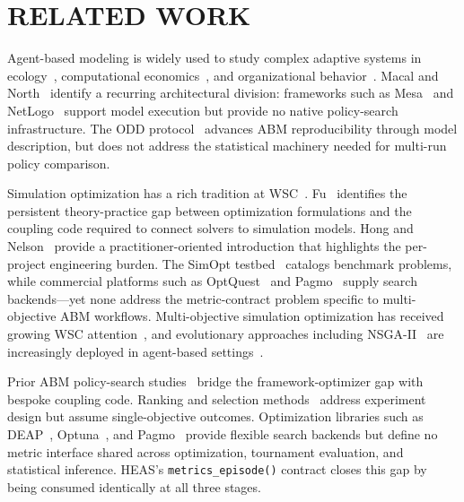 \documentclass{wscpaperproc}
\begin{document}
\section{RELATED WORK}

Agent-based modeling is widely used to study complex adaptive systems in
ecology~\cite{grimm2006odd}, computational economics~\cite{tesfatsion2006ace},
and organizational behavior~\cite{bonabeau2002abm}. Macal and
North~\cite{macal2010tutorial} identify a recurring architectural division:
frameworks such as Mesa~\cite{kazil2020mesa} and NetLogo~\cite{wilensky1999netlogo}
support model execution but provide no native policy-search infrastructure. The
ODD protocol~\cite{grimm2006odd} advances ABM reproducibility through model
description, but does not address the statistical machinery needed for multi-run
policy comparison.

Simulation optimization has a rich tradition at WSC~\cite{fu2002optimization,hong2009brief}.
Fu~\cite{fu2002optimization} identifies the persistent theory-practice gap between
optimization formulations and the coupling code required to connect solvers to
simulation models. Hong and Nelson~\cite{hong2009brief} provide a practitioner-oriented
introduction that highlights the per-project engineering burden. The SimOpt
testbed~\cite{pasupathy2011simopt} catalogs benchmark problems, while commercial
platforms such as OptQuest~\cite{optquest2007} and Pagmo~\cite{biscani2020pagmo}
supply search backends---yet none address the metric-contract problem specific to
multi-objective ABM workflows. Multi-objective simulation optimization has
received growing WSC attention~\cite{hunter2022multiobjective}, and evolutionary
approaches including NSGA-II~\cite{deb2002nsga2} are increasingly deployed in
agent-based settings~\cite{capri2023transport}.

Prior ABM policy-search studies~\cite{tesfatsion2006ace,pangallo2019best,zheng2022aieconomist}
bridge the framework-optimizer gap with bespoke coupling code.
Ranking and selection methods~\cite{goldsman1994ranking} address experiment design
but assume single-objective outcomes.
Optimization libraries such as DEAP~\cite{fortin2012deap},
Optuna~\cite{akiba2019optuna}, and Pagmo~\cite{biscani2020pagmo} provide
flexible search backends but define no metric interface shared across
optimization, tournament evaluation, and statistical inference. HEAS's
\texttt{metrics\_episode()} contract closes this gap by being consumed
identically at all three stages.
\end{document}
